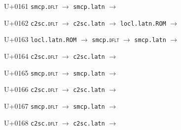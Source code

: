 \documentclass{article}
\begin{document}
\begin{substitutions}
\goodbreak

U+0161  \linebreak
    \texttt{smcp.\textsc{dflt}} $\to$  \linebreak
    \texttt{smcp.latn} $\to$  

\goodbreak

U+0162  \linebreak
    \texttt{c2sc.\textsc{dflt}} $\to$  \linebreak
    \texttt{c2sc.latn} $\to$  \linebreak
    \texttt{locl.latn.ROM} $\to$  

\goodbreak

U+0163  \linebreak
    \texttt{locl.latn.ROM} $\to$  \linebreak
    \texttt{smcp.\textsc{dflt}} $\to$  \linebreak
    \texttt{smcp.latn} $\to$  

\goodbreak

U+0164  \linebreak
    \texttt{c2sc.\textsc{dflt}} $\to$  \linebreak
    \texttt{c2sc.latn} $\to$  

\goodbreak

U+0165  \linebreak
    \texttt{smcp.\textsc{dflt}} $\to$  \linebreak
    \texttt{smcp.latn} $\to$  

\goodbreak

U+0166  \linebreak
    \texttt{c2sc.\textsc{dflt}} $\to$  \linebreak
    \texttt{c2sc.latn} $\to$  

\goodbreak

U+0167  \linebreak
    \texttt{smcp.\textsc{dflt}} $\to$  \linebreak
    \texttt{smcp.latn} $\to$  

\goodbreak

U+0168  \linebreak
    \texttt{c2sc.\textsc{dflt}} $\to$  \linebreak
    \texttt{c2sc.latn} $\to$  


\end{substitutions}
\end{document}
